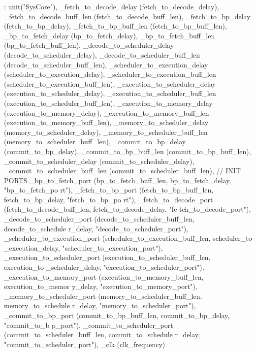 \begin{DoxyCode}
        : unit("SysCore"),
      _fetch_to_decode_delay (fetch_to_decode_delay),
          _fetch_to_decode_buff_len (fetch_to_decode_buff_len),
          _fetch_to_bp_delay (fetch_to_bp_delay),
          _fetch_to_bp_buff_len (fetch_to_bp_buff_len),
          _bp_to_fetch_delay (bp_to_fetch_delay),
          _bp_to_fetch_buff_len (bp_to_fetch_buff_len),
          _decode_to_scheduler_delay (decode_to_scheduler_delay),
          _decode_to_scheduler_buff_len (decode_to_scheduler_buff_len),
          _scheduler_to_execution_delay (scheduler_to_execution_delay),
          _scheduler_to_execution_buff_len (scheduler_to_execution_buff_len),
          _execution_to_scheduler_delay (execution_to_scheduler_delay),
          _execution_to_scheduler_buff_len (execution_to_scheduler_buff_len),
          _execution_to_memory_delay (execution_to_memory_delay),
          _execution_to_memory_buff_len (execution_to_memory_buff_len),
          _memory_to_scheduler_delay (memory_to_scheduler_delay),
          _memory_to_scheduler_buff_len (memory_to_scheduler_buff_len),
          _commit_to_bp_delay (commit_to_bp_delay),
          _commit_to_bp_buff_len (commit_to_bp_buff_len),
          _commit_to_scheduler_delay (commit_to_scheduler_delay),
          _commit_to_scheduler_buff_len (commit_to_scheduler_buff_len),
      // INIT PORTS
      _bp_to_fetch_port (bp_to_fetch_buff_len, bp_to_fetch_delay, "bp_to_fetch_po
      rt"),
      _fetch_to_bp_port (fetch_to_bp_buff_len, fetch_to_bp_delay, "fetch_to_bp_po
      rt"),
      _fetch_to_decode_port (fetch_to_decode_buff_len, fetch_to_decode_delay, "fe
      tch_to_decode_port"),
      _decode_to_scheduler_port (decode_to_scheduler_buff_len, decode_to_schedule
      r_delay, "decode_to_scheduler_port"),
      _scheduler_to_execution_port (scheduler_to_execution_buff_len, scheduler_to
      _execution_delay, "scheduler_to_execution_port"),
      _execution_to_scheduler_port (execution_to_scheduler_buff_len, execution_to
      _scheduler_delay, "execution_to_scheduler_port"),
      _execution_to_memory_port (execution_to_memory_buff_len, execution_to_memor
      y_delay, "execution_to_memory_port"),
      _memory_to_scheduler_port (memory_to_scheduler_buff_len, memory_to_schedule
      r_delay, "memory_to_scheduler_port"),
      _commit_to_bp_port (commit_to_bp_buff_len, commit_to_bp_delay, "commit_to_b
      p_port"),
      _commit_to_scheduler_port (commit_to_scheduler_buff_len, commit_to_schedule
      r_delay, "commit_to_scheduler_port"),
          _clk (clk_frequency)

\end{DoxyCode}
